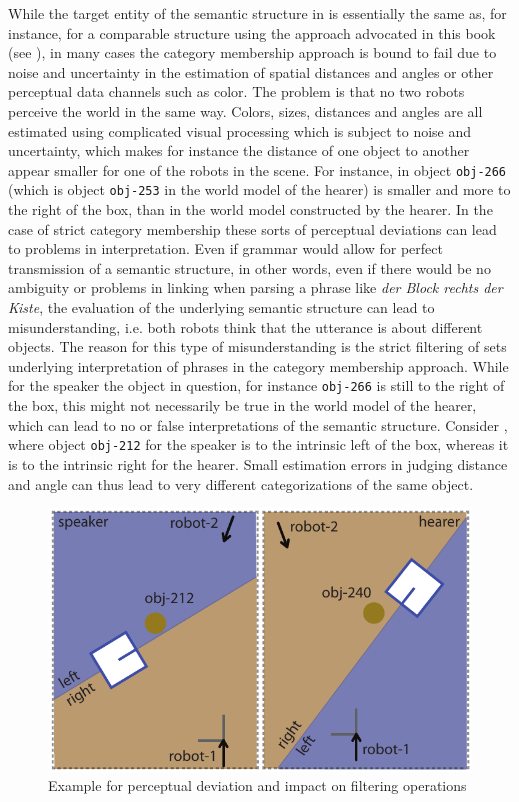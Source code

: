 While the target entity of the semantic structure in  
is essentially the same as, for instance, for a comparable structure using the 
approach advocated in this book (see ),
in many cases the category membership 
approach is bound to fail due to noise and uncertainty in the 
estimation of spatial distances and angles or other perceptual
data channels such as color. The problem is that no two robots perceive
the world in the same way. Colors, sizes, distances and 
angles are all estimated using
complicated visual processing which is subject to noise and uncertainty, which
makes for instance the distance of one object to another appear smaller
for one of the robots in the scene. For instance, in 
object {\footnotesize\tt obj-266} (which is object {\footnotesize\tt obj-253} in the world model 
of the hearer) is smaller and more to the right of the box, than in the world model
constructed by the hearer. In the case of strict category membership these
sorts of perceptual deviations can lead to problems in interpretation.
Even if grammar would allow for perfect transmission of a semantic structure,
in other words, even if there would be no ambiguity or problems
in linking when parsing a phrase like \textit{der Block rechts der Kiste}, the
evaluation of the underlying semantic structure can lead to misunderstanding, 
i.e. both robots think that the utterance is about different objects. 
The reason for this type of misunderstanding is the strict filtering of sets
underlying interpretation of phrases in the category membership
approach. While for the speaker the object in question, for instance 
{\footnotesize\tt obj-266} is still to the right of the box, this might not necessarily 
be true in the world model of the hearer, which can lead to no or false 
interpretations of the semantic structure. Consider 
, where object {\footnotesize\tt obj-212}
for the speaker is to the intrinsic left of the box, whereas it is to the
intrinsic right for the hearer. Small estimation errors in judging
distance and angle can thus lead to very different categorizations of 
the same object.

\begin{figure}
\begin{center}
\includegraphics[width=0.5\columnwidth]{figs/perceptual-deviation}
\end{center}
\caption[Perceptual deviation]{Example for perceptual deviation and
impact on filtering operations}
\label{f:perceptual-deviation}
\end{figure}

